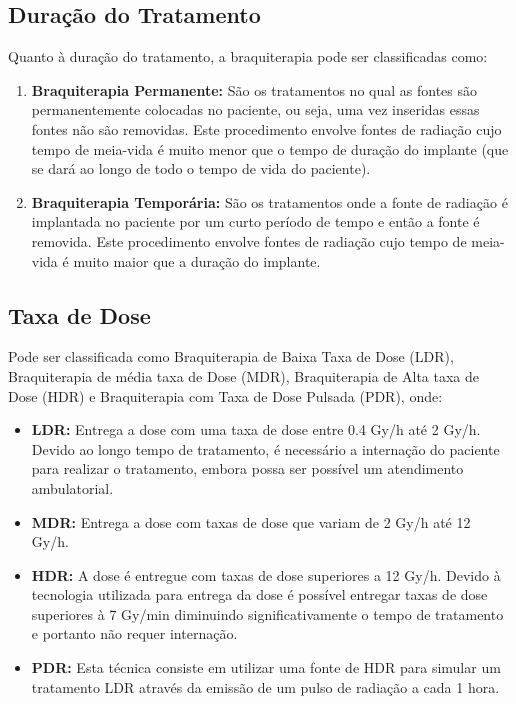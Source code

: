 \documentclass[11pt,a4paper]{article}
\begin{document}
		\subsection{Duração do Tratamento}

			Quanto à duração do tratamento, a braquiterapia pode ser classificadas como:

			\begin{enumerate}

				\item \textbf{Braquiterapia Permanente:}  São os tratamentos no qual as fontes são permanentemente colocadas no paciente, ou seja, uma vez inseridas essas fontes não são removidas. Este procedimento envolve fontes de radiação cujo tempo de meia-vida é muito menor que o tempo de duração do implante (que se dará ao longo de todo o tempo de vida do paciente).
				
				\item \textbf{Braquiterapia Temporária:} São os tratamentos onde a fonte de radiação é implantada no paciente por um curto período de tempo e então a fonte é removida. Este procedimento envolve fontes de radiação cujo tempo de meia-vida é muito maior que a duração do implante.
				
			\end{enumerate}

		\subsection{Taxa de Dose}

			Pode ser classificada como Braquiterapia de Baixa Taxa de Dose (LDR), Braquiterapia de média taxa de Dose (MDR), Braquiterapia de Alta taxa de Dose (HDR) e Braquiterapia com Taxa de Dose Pulsada (PDR), onde:

			\begin{itemize}
				\item \textbf{LDR:} Entrega a dose com uma taxa de dose entre 0.4 Gy/h até 2 Gy/h. Devido ao longo tempo de tratamento, é necessário a internação do paciente para realizar o tratamento, embora possa ser possível um atendimento ambulatorial.
				\item \textbf{MDR:} Entrega a dose com taxas de dose que variam de 2 Gy/h até 12 Gy/h.
				\item  \textbf{HDR:} A dose é entregue com taxas de dose superiores a 12 Gy/h. Devido à tecnologia utilizada para entrega da dose é possível entregar taxas de dose superiores à 7 Gy/min diminuindo significativamente o tempo de tratamento e portanto não requer internação. 
				\item \textbf{PDR:} Esta técnica consiste em utilizar uma fonte de HDR para simular um tratamento LDR através da emissão de um pulso de radiação a cada 1 hora.
			\end{itemize}
\end{document}
